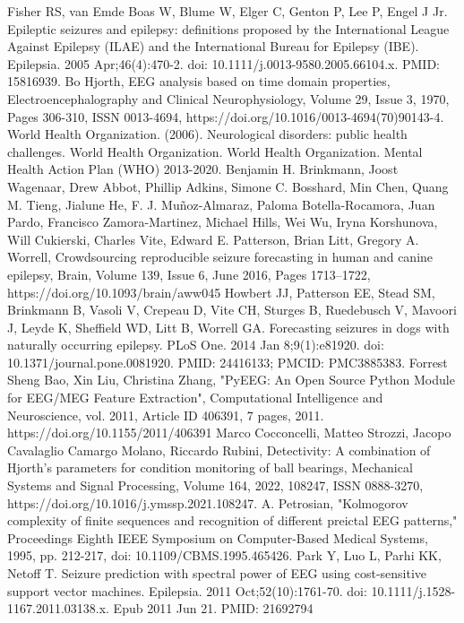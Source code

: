 \documentclass[10pt,twocolumn,letterpaper]{article}
\begin{document}
\begin{thebibliography}{9}

Fisher RS, van Emde Boas W, Blume W, Elger C, Genton P, Lee P, Engel J Jr. Epileptic seizures and epilepsy: definitions proposed by the International League Against Epilepsy (ILAE) and the International Bureau for Epilepsy (IBE). Epilepsia. 2005 Apr;46(4):470-2. doi: 10.1111/j.0013-9580.2005.66104.x. PMID: 15816939.
 Bo Hjorth,
EEG analysis based on time domain properties,
Electroencephalography and Clinical Neurophysiology,
Volume 29, Issue 3,
1970,
Pages 306-310,
ISSN 0013-4694,
https://doi.org/10.1016/0013-4694(70)90143-4.
 World Health Organization. (2006). Neurological disorders: public health challenges. World Health Organization.
World Health Organization. Mental Health Action Plan (WHO) 2013-2020.
 Benjamin H. Brinkmann, Joost Wagenaar, Drew Abbot, Phillip Adkins, Simone C. Bosshard, Min Chen, Quang M. Tieng, Jialune He, F. J. Muñoz-Almaraz, Paloma Botella-Rocamora, Juan Pardo, Francisco Zamora-Martinez, Michael Hills, Wei Wu, Iryna Korshunova, Will Cukierski, Charles Vite, Edward E. Patterson, Brian Litt, Gregory A. Worrell, Crowdsourcing reproducible seizure forecasting in human and canine epilepsy, Brain, Volume 139, Issue 6, June 2016, Pages 1713–1722, https://doi.org/10.1093/brain/aww045
Howbert JJ, Patterson EE, Stead SM, Brinkmann B, Vasoli V, Crepeau D, Vite CH, Sturges B, Ruedebusch V, Mavoori J, Leyde K, Sheffield WD, Litt B, Worrell GA. Forecasting seizures in dogs with naturally occurring epilepsy. PLoS One. 2014 Jan 8;9(1):e81920. doi: 10.1371/journal.pone.0081920. PMID: 24416133; PMCID: PMC3885383.
Forrest Sheng Bao, Xin Liu, Christina Zhang, "PyEEG: An Open Source Python Module for EEG/MEG Feature Extraction", Computational Intelligence and Neuroscience, vol. 2011, Article ID 406391, 7 pages, 2011. https://doi.org/10.1155/2011/406391
Marco Cocconcelli, Matteo Strozzi, Jacopo Cavalaglio Camargo Molano, Riccardo Rubini,
Detectivity: A combination of Hjorth’s parameters for condition monitoring of ball bearings,
Mechanical Systems and Signal Processing,
Volume 164,
2022,
108247,
ISSN 0888-3270,
https://doi.org/10.1016/j.ymssp.2021.108247. 
A. Petrosian, "Kolmogorov complexity of finite sequences and recognition of different preictal EEG patterns," Proceedings Eighth IEEE Symposium on Computer-Based Medical Systems, 1995, pp. 212-217, doi: 10.1109/CBMS.1995.465426.
 Park Y, Luo L, Parhi KK, Netoff T. Seizure prediction with spectral power of EEG using cost-sensitive support vector machines. Epilepsia. 2011 Oct;52(10):1761-70. doi: 10.1111/j.1528-1167.2011.03138.x. Epub 2011 Jun 21. PMID: 21692794

\end{thebibliography}
\end{document}
